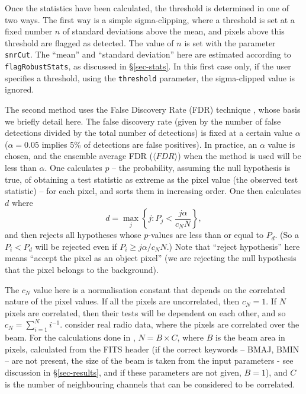 
Once the statistics have been calculated, the threshold is determined
in one of two ways. The first way is a simple sigma-clipping, where a
threshold is set at a fixed number $n$ of standard deviations above
the mean, and pixels above this threshold are flagged as detected. The
value of $n$ is set with the parameter \texttt{snrCut}. The ``mean''
and ``standard deviation'' here are estimated according to
\texttt{flagRobustStats}, as discussed in \S\ref{sec-stats}. In this
first case only, if the user specifies a threshold, using the
\texttt{threshold} parameter, the sigma-clipped value is ignored.

The second method uses the False Discovery Rate (FDR) technique
\citep{miller01,hopkins02}, whose basis we briefly detail here. The
false discovery rate (given by the number of false detections divided
by the total number of detections) is fixed at a certain value
$\alpha$ (\eg $\alpha=0.05$ implies 5\% of detections are false
positives). In practice, an $\alpha$ value is chosen, and the ensemble
average FDR (\ie $\langle FDR \rangle$) when the method is used will
be less than $\alpha$.  One calculates $p$ -- the probability,
assuming the null hypothesis is true, of obtaining a test statistic as
extreme as the pixel value (the observed test statistic) -- for each
pixel, and sorts them in increasing order. One then calculates $d$
where
\[
d = \max_j \left\{ j : P_j < \frac{j\alpha}{c_N N} \right\},
\]
and then rejects all hypotheses whose $p$-values are less than or
equal to $P_d$. (So a $P_i<P_d$ will be rejected even if $P_i \geq
j\alpha/c_N N$.) Note that ``reject hypothesis'' here means ``accept
the pixel as an object pixel'' (\ie we are rejecting the null
hypothesis that the pixel belongs to the background).

The $c_N$ value here is a normalisation constant that depends on the
correlated nature of the pixel values. If all the pixels are
uncorrelated, then $c_N=1$. If $N$ pixels are correlated, then their
tests will be dependent on each other, and so $c_N = \sum_{i=1}^N
i^{-1}$. \citet{hopkins02} consider real radio data, where the pixels
are correlated over the beam. For the calculations done in \duchamp,
$N = B \times C$, where $B$ is the beam area in pixels, calculated
from the FITS header (if the correct keywords -- BMAJ, BMIN -- are not
present, the size of the beam is taken from the input parameters - see
discussion in \S\ref{sec-results}, and if these parameters are not
given, $B=1$), and $C$ is the number of neighbouring channels that can
be considered to be correlated.

